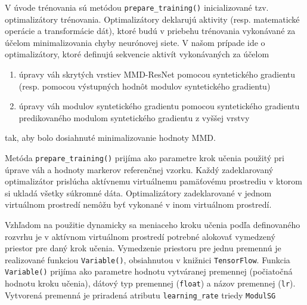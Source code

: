 V úvode trénovania sú metódou \texttt{prepare_training()} inicializované tzv. optimalizátory trénovania. Optimalizátory deklarujú aktivity (resp. matematické operácie a transformácie dát), ktoré budú v priebehu trénovania vykonávané za účelom minimalizovania chyby neurónovej siete. V našom prípade ide o optimalizátory, ktoré definujú sekvencie aktivít vykonávaných za účelom 
\begin{enumerate}
    \item úpravy váh skrytých vrstiev MMD-ResNet pomocou syntetického gradientu (resp. pomocou výstupných hodnôt modulov syntetického gradientu)
    \item úpravy váh modulov syntetického gradientu pomocou syntetického gradientu predikovaného modulom syntetického gradientu z vyššej vrstvy
\end{enumerate}
tak, aby bolo dosiahnuté minimalizovanie hodnoty MMD.

Metóda \texttt{prepare_training()} prijíma ako parametre krok učenia použitý pri úprave váh a hodnoty markerov referenčnej vzorku. Každý zadeklarovaný optimalizátor prislúcha aktívnemu virtuálnemu pamäťovému prostrediu v ktorom si ukladá všetky súkromné dáta. Optimalizátory zadeklarované v jednom virtuálnom prostredí nemôžu byť vykonané v inom virtuálnom prostredí.

Vzhľadom na použitie dynamicky sa meniaceho kroku učenia podľa definovaného rozvrhu je v aktívnom virtuálnom prostredí potrebné alokovať vymedzený priestor pre daný krok učenia. Vymedzenie priestoru pre jednu premennú je realizované funkciou \texttt{Variable()}, obsiahnutou v knižnici \texttt{TensorFlow}. Funkcia \texttt{Variable()} prijíma ako parametre hodnotu vytváranej premennej (počiatočná hodnotu kroku učenia), dátový typ premennej (\texttt{float}) a názov premennej (\texttt{lr}). Vytvorená premenná je priradená atributu \texttt{learning_rate} triedy \texttt{ModulSG}

